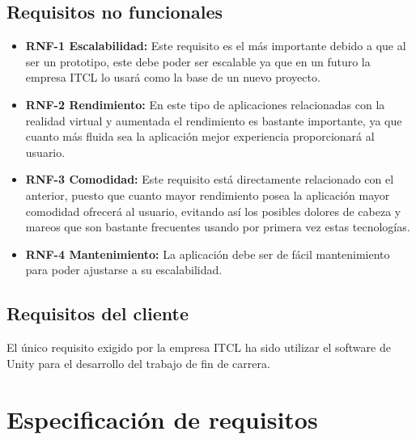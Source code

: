 \subsection{Requisitos no funcionales}
\begin{itemize}
    \item \textbf{RNF-1 Escalabilidad:} Este requisito es el más importante debido a que al ser un prototipo, este debe poder ser escalable ya que en un futuro la empresa ITCL lo usará como la base de un nuevo proyecto.
    \item \textbf{RNF-2 Rendimiento:} En este tipo de aplicaciones relacionadas con la realidad virtual y aumentada el rendimiento es bastante importante, ya que cuanto más fluida sea la aplicación mejor experiencia proporcionará al usuario.
    \item \textbf{RNF-3 Comodidad:} Este requisito está directamente relacionado con el anterior, puesto que cuanto mayor rendimiento posea la aplicación mayor comodidad ofrecerá al usuario, evitando así los posibles dolores de cabeza y mareos que son bastante frecuentes usando por primera vez estas tecnologías.
    \item \textbf{RNF-4 Mantenimiento:} La aplicación debe ser de fácil mantenimiento para poder ajustarse a su escalabilidad.
\end{itemize}


\subsection{Requisitos del cliente}  

El único requisito exigido por la empresa ITCL ha sido utilizar el software de Unity para el desarrollo del trabajo de fin de carrera. 

\section{Especificación de requisitos}

